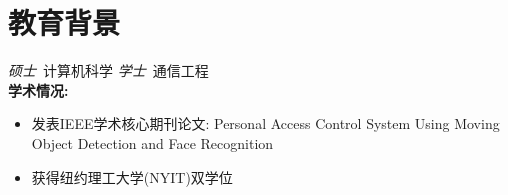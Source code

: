 \documentclass{resume}
\begin{document}


 
\section{教育背景}
\textit{硕士}\ 计算机科学
\textit{学士}\ 通信工程\\
\textbf{学术情况:}\ 
\begin{itemize}
  \item 发表IEEE学术核心期刊论文: Personal Access Control System Using Moving Object Detection and Face Recognition
  \item 获得纽约理工大学(NYIT)双学位
\end{itemize}
\end{document}
